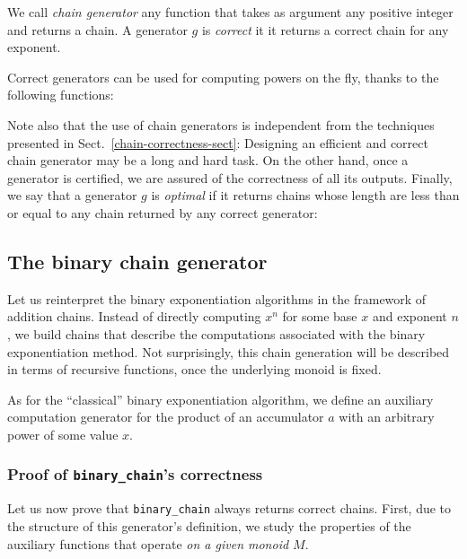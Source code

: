 We call \emph{chain generator} any function that takes as argument 
any positive integer and returns a chain.
A generator $g$  is \emph{correct} it it returns a correct chain
for any exponent.


Correct generators can be used for computing powers 
on the fly, thanks to the following functions:



Note also that the use of chain generators is independent from  the techniques presented in Sect.~\ref{chain-correctness-sect}:
Designing an efficient and correct chain generator may be a long and hard task.
On the other hand, once a generator is certified, we are assured of the correctness of  
all its outputs.
Finally, we say that a generator $g$ is \emph{optimal} if it returns chains whose length are less than or
equal to any chain returned by any correct generator:


\subsection{The binary chain generator}

Let us reinterpret the  binary exponentiation algorithms in the framework 
of addition chains.
Instead of directly computing $x^n$ for some base $x$ and exponent $n$,
we build chains that describe the computations associated with the binary exponentiation method.
Not surprisingly, this chain generation will be described in terms of recursive
functions, once the underlying monoid is fixed.

As for the ``classical'' binary exponentiation algorithm,
we define an auxiliary computation generator for  the
product of an accumulator $a$ with an arbitrary power of some value $x$.





\subsubsection{Proof of \texttt{binary\_chain}'s correctness}

Let us now prove that \texttt{binary\_chain} always returns correct chains.
First, due to the structure of this generator's definition, we study the
properties of the auxiliary functions that operate \emph{on a given monoid $M$}.

